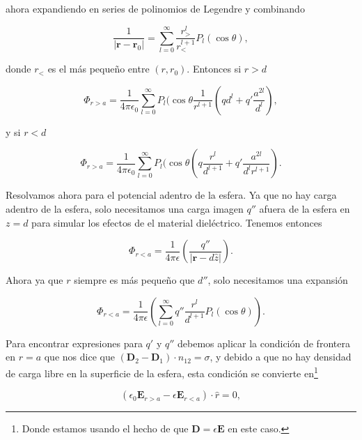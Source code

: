 \documentclass[a4paper,11pt]{article}
\numberwithin{equation}{section}
\begin{document}
ahora expandiendo en series de polinomios de Legendre y combinando

\begin{equation}
 \frac{1}{|\mathbf{r} - \mathbf{r}_0|} = 
 \sum_{l=0}^\infty \frac{r_{>}^l}{r_{<}^{l+1}}P_l(\cos{\theta}),
\end{equation}

donde $r_{<}$ es el más pequeño entre $(r,r_0)$. Entonces si $r > d$ 

\begin{equation}
 \Phi_{r > a} = \frac{1}{4\pi\epsilon_0}\sum_{l=0}^\infty P_l(\cos{\theta} 
 \frac{1}{r^{l+1}} \left(qd^l + q'\frac{a^{2l}}{d^l}\right),
\end{equation}

y si $r < d$

\begin{equation}
  \Phi_{r > a} = \frac{1}{4\pi\epsilon_0}\sum_{l=0}^\infty P_l(\cos{\theta} 
  \left(q\frac{r^l}{d^{l+1}} + q'\frac{a^{2l}}{d^lr^{l+1}} \right).
\end{equation}

Resolvamos ahora para el potencial adentro de la esfera. Ya que no hay carga adentro 
de la esfera, solo necesitamos una carga imagen $q''$ afuera de la esfera en $z=d$ 
para simular los efectos de el material dieléctrico. Tenemos entonces 

\begin{equation}
 \Phi_{r < a} = \frac{1}{4\pi\epsilon}\left(\frac{q''}{|\mathbf{r} - d\hat{z}|}\right). 
\end{equation}

Ahora ya que $r$ siempre es más pequeño que $d''$, solo necesitamos una expansión 

\begin{equation}
 \Phi_{r < a} = \frac{1}{4\pi\epsilon}\left(\sum_{l=0}^\infty q'' 
 \frac{r^l}{d^{l+1}}P_l(\cos{\theta})\right).
\end{equation}

Para encontrar expresiones para $q'$ y $q''$ debemos aplicar la condición de 
frontera en $r = a$ que nos dice que $(\mathbf{D}_2 
- \mathbf{D}_1)\cdot n_{12} = \sigma$, y debido a que no hay densidad de carga 
libre en la superficie de la esfera, esta condición se convierte en\footnote{Donde 
estamos usando el hecho de que $\mathbf{D} = \epsilon \mathbf{E}$ en este caso.}

\begin{equation}
 \left(\epsilon_0 \mathbf{E}_{r > a} - \epsilon \mathbf{E}_{r < a}\right)\cdot \hat{r} = 0,
\end{equation}
\end{document}
